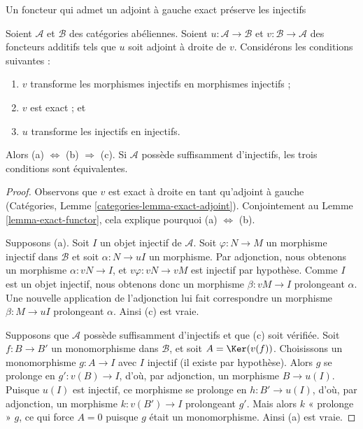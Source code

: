 \begin{lemma}
\label{lemma-adjoint-preserve-injectives}
\begin{slogan}
Un foncteur qui admet un adjoint à gauche exact préserve les injectifs
\end{slogan}
Soient $\mathcal{A}$ et $\mathcal{B}$ des catégories abéliennes.
Soient $u : \mathcal{A} \to \mathcal{B}$ et
$v : \mathcal{B} \to \mathcal{A}$ des foncteurs additifs tels que
$u$ soit adjoint à droite de $v$. Considérons les conditions suivantes :
\begin{enumerate}
\item[(a)] $v$ transforme les morphismes injectifs en morphismes injectifs ;
\item[(b)] $v$ est exact ; et
\item[(c)] $u$ transforme les injectifs en injectifs.
\end{enumerate}
Alors (a) $\Leftrightarrow$ (b) $\Rightarrow$ (c). Si $\mathcal{A}$
possède suffisamment d'injectifs, les trois conditions sont équivalentes.
\end{lemma}

\begin{proof}
Observons que $v$ est exact à droite en tant qu'adjoint à gauche
(Catégories, Lemme
\ref{categories-lemma-exact-adjoint}). Conjointement au
Lemme \ref{lemma-exact-functor}, cela explique pourquoi
(a) $\Leftrightarrow$ (b).

\medskip\noindent
Supposons (a). Soit $I$ un objet injectif de $\mathcal{A}$.
Soit $\varphi : N \to M$ un morphisme injectif dans $\mathcal{B}$ et soit
$\alpha : N \to uI$ un morphisme.
Par adjonction, nous obtenons un morphisme $\alpha : vN \to I$, et
$v\varphi : vN \to vM$ est injectif par hypothèse.
Comme $I$ est un objet injectif, nous obtenons donc un morphisme
$\beta : vM \to I$ prolongeant $\alpha$. Une nouvelle application de
l'adjonction lui fait correspondre un morphisme $\beta : M \to uI$
prolongeant $\alpha$. Ainsi (c) est vraie.

\medskip\noindent
Supposons que $\mathcal{A}$ possède suffisamment d'injectifs et que (c)
soit vérifiée. Soit $f : B \to B'$ un monomorphisme dans $\mathcal{B}$,
et soit $A = \Ker(v(f))$. Choisissons un monomorphisme $g : A \to I$ avec
$I$ injectif (il existe par hypothèse). Alors $g$ se prolonge en
$g' : v(B) \to I$, d'où, par adjonction, un morphisme $B \to u(I)$.
Puisque $u(I)$ est injectif, ce morphisme se prolonge en
$h : B' \to u(I)$, d'où, par adjonction, un morphisme
$k : v(B') \to I$ prolongeant $g'$. Mais alors $k$ « prolonge » $g$,
ce qui force $A = 0$ puisque $g$ était un monomorphisme. Ainsi (a) est vraie.
\end{proof}

